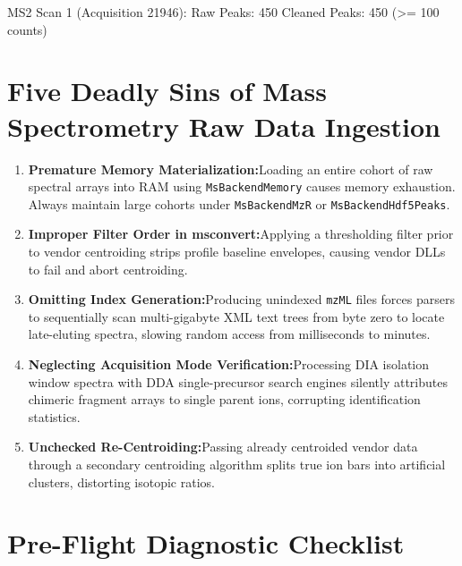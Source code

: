 \documentclass[11pt,twoside,openright]{book}
\begin{document}
\begin{routput}
MS2 Scan 1 (Acquisition 21946):
  Raw Peaks:     450
  Cleaned Peaks: 450 (>= 100 counts)
\end{routput}

\section{Five Deadly Sins of Mass Spectrometry Raw Data Ingestion}
\label{sec:deadly_sins}

\begin{enumerate}
    \item \textbf{Premature Memory Materialization:}\enspace Loading an entire cohort of raw spectral arrays into RAM using \texttt{MsBackendMemory} causes memory exhaustion. Always maintain large cohorts under \texttt{MsBackendMzR} or \texttt{MsBackendHdf5Peaks}.
    \item \textbf{Improper Filter Order in msconvert:}\enspace Applying a thresholding filter prior to vendor centroiding strips profile baseline envelopes, causing vendor DLLs to fail and abort centroiding.
    \item \textbf{Omitting Index Generation:}\enspace Producing unindexed \texttt{mzML} files forces parsers to sequentially scan multi-gigabyte XML text trees from byte zero to locate late-eluting spectra, slowing random access from milliseconds to minutes.
    \item \textbf{Neglecting Acquisition Mode Verification:}\enspace Processing DIA isolation window spectra with DDA single-precursor search engines silently attributes chimeric fragment arrays to single parent ions, corrupting identification statistics.
    \item \textbf{Unchecked Re-Centroiding:}\enspace Passing already centroided vendor data through a secondary centroiding algorithm splits true ion bars into artificial clusters, distorting isotopic ratios.
\end{enumerate}

\section{Pre-Flight Diagnostic Checklist}
\label{sec:diagnostic_checklist}
\end{document}
